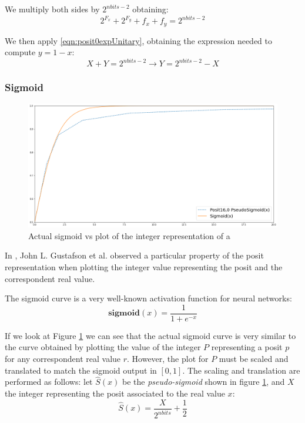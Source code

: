 We multiply both sides by $2^{nbits - 2}$ obtaining:
\begin{equation}
    2^{F_x} + 2^{F_y} + f_x + f_y = 2^{nbits - 2}
\end{equation}

We then apply  \eqref{eqn:posit0expUnitary}, obtaining the expression needed to compute $y = 1 - x$:
\begin{equation}
    X + Y = 2^{nbits - 2} \xrightarrow{} Y = 2^{nbits - 2} - X
\end{equation}



\subsubsection{Sigmoid}
\begin{figure}
    \centering
    \includegraphics[width=\linewidth]{img/sigmoidPosit160.png}
    \caption{Actual sigmoid vs plot of the integer representation of a }
    \label{fig:posit160Sigmoid}
\end{figure}

In \cite{gustafson2017beating}, John L. Gustafson et al. observed a particular property of the posit representation when plotting the integer value representing the posit and the correspondent real value.

The sigmoid curve is a very well-known activation function for neural networks:
\begin{equation}
    \mathbf{sigmoid}(x) = \frac{1}{1 + e^{-x}}
\end{equation}

If we look at Figure \ref{fig:posit160Sigmoid} we can see that the actual sigmoid curve is very similar to the curve obtained by plotting the value of the integer $P$ representing a posit $p$ for any correspondent real value $r$. However, the plot for $P$ must be scaled and translated to match the sigmoid output in $[0,1]$. The scaling and translation are performed as follows: let $\hat{S}(x)$ be the \textit{pseudo-sigmoid} shown in figure \ref{fig:posit160Sigmoid}, and $X$ the integer representing the posit associated to the real value $x$:
\begin{equation}
    \hat{S}(x) = \frac{X}{2^{nbits}} + \frac{1}{2}
\end{equation}

